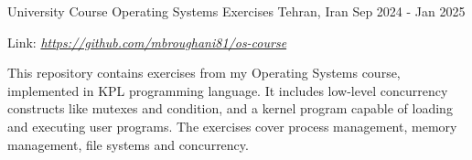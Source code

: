 

\begin{cventries}

  \cventry
  {University Course} %
  {Operating Systems Exercises} %
  {Tehran, Iran} %
  {Sep 2024 - Jan 2025} %
  {
    \begin{cvitems} %
    \item {Link: \href{https://github.com/mbroughani81/os-course}{\textit{https://github.com/mbroughani81/os-course}}}
    \item{
        This repository contains exercises from my Operating Systems course,
        implemented in KPL programming language. It includes low-level
        concurrency constructs like mutexes and condition, and a
        kernel program capable of loading and executing user programs. The
        exercises cover process management, memory management, file systems and concurrency.
      }
    \end{cvitems}
  }


\end{cventries}
